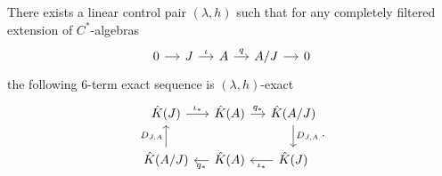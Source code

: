 \begin{thm}
There exists a linear control pair $(\lambda,h)$ such that for any completely filtered extension of $C^*$-algebras 
\[\begin{tikzcd}[column sep = small]0\arrow{r} & J\arrow{r}{\iota} & A\arrow{r}{q} & A/J\arrow{r} & 0 \end{tikzcd}\]
the following $6$-term exact sequence is $(\lambda,h)$-exact
\[\begin{tikzcd}[column sep = small]
 \hat K(J) \arrow{r}{\iota_*} & \hat K(A) \arrow{r}{q_*} & \hat K(A/J)\arrow{d}{D_{J,A}} \\
 \hat K(A/J) \arrow{u}{D_{J,A}} & \hat K(A) \arrow{l}{q_*} & \hat K(J)\arrow{l}{\iota_*}
\end{tikzcd}.\]
\end{thm}

























